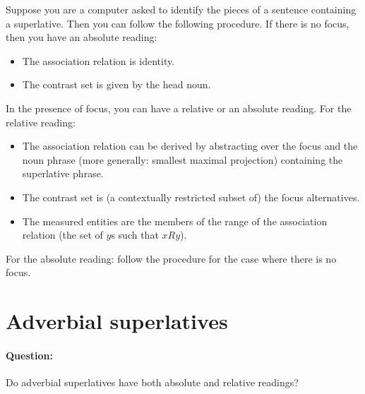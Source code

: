\documentclass{article}
\begin{document}
Suppose you are a computer asked to identify the pieces of a sentence
containing a superlative. Then you can follow the following procedure.
If there is no focus, then you have an absolute reading:
\begin{itemize}
\item The association relation is identity.
\item The contrast set is given by the head noun.
\end{itemize}
In the presence of focus,  you can have a relative or an absolute
reading. For the relative reading:
\begin{itemize}
\item The association relation can be derived by
abstracting over the focus and the noun phrase (more generally:
smallest maximal projection) containing the superlative
phrase. %
\item The contrast set is (a contextually restricted
  subset of) the focus alternatives.
\item The measured entities are the members of the range of the
  association relation (the set of $y$s such that $xRy$).
\end{itemize}
For the absolute reading: follow the procedure for the case where
there is no focus.



           





\section{Adverbial superlatives}

\paragraph{Question:} Do adverbial superlatives have both absolute and relative readings?
\end{document}
